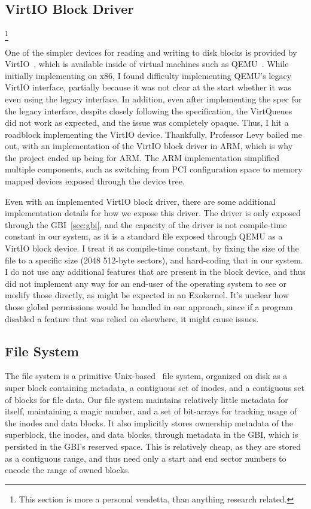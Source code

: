 \documentclass[letterpaper,twocolumn,10pt]{article}
\begin{document}
\subsection{VirtIO Block Driver}
\footnote{This section is more a personal vendetta, than anything research related.}

One of the simpler devices for reading and writing to disk blocks is provided by
VirtIO~\cite{virtio}, which is available inside of virtual machines such as QEMU~\cite{qemu}.
While initially implementing on x86, I found difficulty implementing QEMU's legacy VirtIO
interface, partially because it was not clear at the start whether it was even using the legacy
interface. In addition, even after implementing the spec for the legacy interface, despite
closely following the specification, the VirtQueues did not work as expected, and the issue was
completely opaque. Thus, I hit a roadblock implementing the VirtIO device. Thankfully, Professor
Levy bailed me out, with an implementation of the VirtIO block driver in ARM, which is why the
project ended up being for ARM. The ARM implementation simplified multiple components, such as
switching from PCI configuration space to memory mapped devices exposed through the device tree.

Even with an implemented VirtIO block driver, there are some additional implementation details
for how we expose this driver.  The driver is only exposed through the GBI~\ref{sec:gbi}, and
the capacity of the driver is not compile-time constant in our system, as it is a standard
file exposed through QEMU as a VirtIO block device. I treat it as compile-time constant, by
fixing the size of the file to a specific size (2048 512-byte sectors), and hard-coding that in
our system. I do not use any additional features that are present in the block device, and thus
did not implement any way for an end-user of the operating system to see or modify those
directly, as might be expected in an Exokernel. It's unclear how those global permissions would
be handled in our approach, since if a program disabled a feature that was relied on elsewhere,
it might cause issues.

\subsection{File System}

The file system is a primitive Unix-based~\cite{unix} file system, organized on disk as a super
block containing metadata, a contiguous set of inodes, and a contiguous set of blocks for file
data. Our file system maintains relatively little metadata for itself, maintaining a magic
number, and a set of bit-arrays for tracking usage of the inodes and data blocks. It also
implicitly stores ownership metadata of the superblock, the inodes, and data blocks, through
metadata in the GBI, which is persisted in the GBI's reserved space. This is relatively cheap,
as they are stored as a contiguous range, and thus need only a start and end sector numbers to
encode the range of owned blocks.
\end{document}
